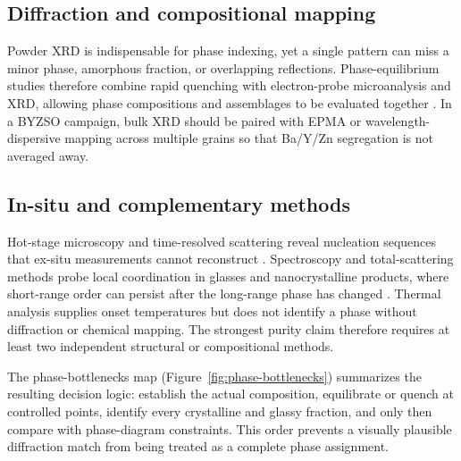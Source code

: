 \subsection{Diffraction and compositional mapping}

Powder XRD is indispensable for phase indexing, yet a single pattern can miss a minor phase, amorphous fraction, or overlapping reflections. Phase-equilibrium studies therefore combine rapid quenching with electron-probe microanalysis and XRD, allowing phase compositions and assemblages to be evaluated together \cite{kim2025key,derensy2026phase,abdeyazdan2024phase,abdeyazdan2023experimental}. In a BYZSO campaign, bulk XRD should be paired with EPMA or wavelength-dispersive mapping across multiple grains so that Ba\slash Y\slash Zn segregation is not averaged away.

\subsection{In-situ and complementary methods}

Hot-stage microscopy and time-resolved scattering reveal nucleation sequences that ex-situ measurements cannot reconstruct \cite{bocker2012in,mckenzie2020nucleation,mckenzie2021nucleation,aspillaga2023nucleation}. Spectroscopy and total-scattering methods probe local coordination in glasses and nanocrystalline products, where short-range order can persist after the long-range phase has changed \cite{mastelaro2018x,abdelhameed2023structural,shaaban2021spectroscopic,topper2023zinc}. Thermal analysis supplies onset temperatures but does not identify a phase without diffraction or chemical mapping. The strongest purity claim therefore requires at least two independent structural or compositional methods.

The phase-bottlenecks map (Figure~\ref{fig:phase-bottlenecks}) summarizes the
resulting decision logic: establish the actual composition, equilibrate or quench
at controlled points, identify every crystalline and glassy fraction, and only
then compare with phase-diagram constraints. This order prevents a visually
plausible diffraction match from being treated as a complete phase assignment.
